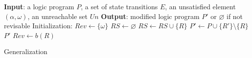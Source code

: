 \begin{algorithm}[ht]
\begin{algorithmic}
    \State \textbf{Input}: a logic program $P$, a set of state transitions $E$, an unsatisfied element $(\alpha,\omega)$, an unreachable set $Un$
    \State \textbf{Output}: modified logic program $P'$ or $\varnothing$ if not revisable
    \State Initialization: $Rev\gets\{\omega\}$
    \Do
    \State $RS\gets \varnothing$
            \State $RS\gets RS\cup \{R\}$
        \EndIf
    \EndFor
            \State $P'\gets P\cup \{R'\}\setminus \{R\}$
                    \Return $P'$
                \EndIf
            \EndIf
        \EndFor
    \EndFor
        \State $Rev\gets b(R)$
    \EndFor
\end{algorithmic}
\caption{Generalization}\label{alg:generalization}
\end{algorithm}
